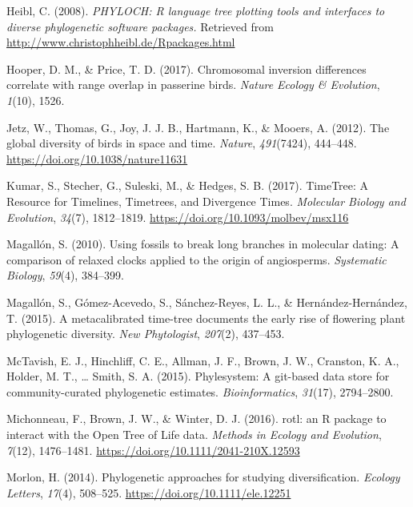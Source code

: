 \documentclass[
  english,
  man]{apa6}
\newlength{\cslhangindent}
\newlength{\cslentryspacingunit} %
\newenvironment{CSLReferences}[2] %
 {%
  \setlength{\parindent}{0pt}
  \ifodd #1
  \let\oldpar\par
  \def\par{\hangindent=\cslhangindent\oldpar}
  \fi
  \setlength{\parskip}{#2\cslentryspacingunit}
 }%
 {}
\begin{document}
\begin{CSLReferences}{1}{0}
\leavevmode{}%
Heibl, C. (2008). \emph{PHYLOCH: R language tree plotting tools and interfaces to diverse phylogenetic software packages.} Retrieved from \url{http://www.christophheibl.de/Rpackages.html}

\leavevmode{}%
Hooper, D. M., \& Price, T. D. (2017). Chromosomal inversion differences correlate with range overlap in passerine birds. \emph{Nature Ecology \& Evolution}, \emph{1}(10), 1526.

\leavevmode{}%
Jetz, W., Thomas, G., Joy, J. J. B., Hartmann, K., \& Mooers, A. (2012). {The global diversity of birds in space and time}. \emph{Nature}, \emph{491}(7424), 444--448. \url{https://doi.org/10.1038/nature11631}

\leavevmode{}%
Kumar, S., Stecher, G., Suleski, M., \& Hedges, S. B. (2017). {TimeTree: A Resource for Timelines, Timetrees, and Divergence Times}. \emph{Molecular Biology and Evolution}, \emph{34}(7), 1812--1819. \url{https://doi.org/10.1093/molbev/msx116}

\leavevmode{}%
Magallón, S. (2010). Using fossils to break long branches in molecular dating: A comparison of relaxed clocks applied to the origin of angiosperms. \emph{Systematic Biology}, \emph{59}(4), 384--399.

\leavevmode{}%
Magallón, S., Gómez-Acevedo, S., Sánchez-Reyes, L. L., \& Hernández-Hernández, T. (2015). A metacalibrated time-tree documents the early rise of flowering plant phylogenetic diversity. \emph{New Phytologist}, \emph{207}(2), 437--453.

\leavevmode{}%
McTavish, E. J., Hinchliff, C. E., Allman, J. F., Brown, J. W., Cranston, K. A., Holder, M. T., \ldots{} Smith, S. A. (2015). Phylesystem: A git-based data store for community-curated phylogenetic estimates. \emph{Bioinformatics}, \emph{31}(17), 2794--2800.

\leavevmode{}%
Michonneau, F., Brown, J. W., \& Winter, D. J. (2016). {rotl: an R package to interact with the Open Tree of Life data}. \emph{Methods in Ecology and Evolution}, \emph{7}(12), 1476--1481. \url{https://doi.org/10.1111/2041-210X.12593}

\leavevmode{}%
Morlon, H. (2014). {Phylogenetic approaches for studying diversification.} \emph{Ecology Letters}, \emph{17}(4), 508--525. \url{https://doi.org/10.1111/ele.12251}


\end{CSLReferences}
\end{document}

